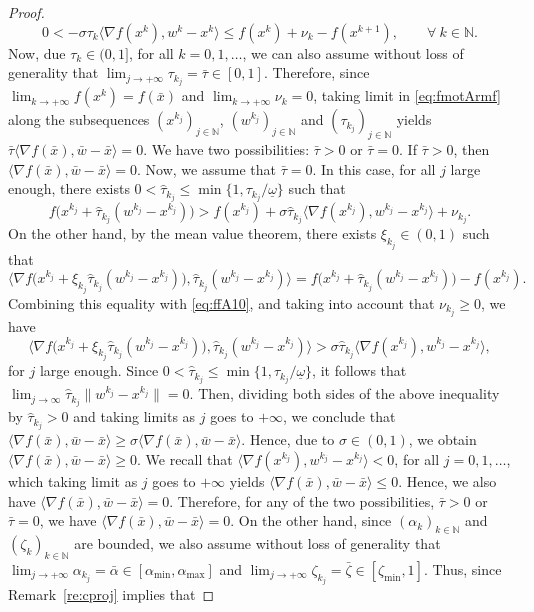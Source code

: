 \begin{proof}
	\begin{equation}\label{eq:fmotArmf}
		0 < -\sigma\tau_{k} \big\langle \nabla f(x^{k}), w^{k}-x^{k} \big\rangle \leq f(x^{k}) +\nu_k- f(x^{k+1}), \qquad \forall ~k \in \mathbb{N}.
	\end{equation}
	Now, due $\tau_k \in (0,1]$, for all $k=0,1, \ldots$, we can also assume without loss of generality that $\lim_{j \to +\infty} \tau_{k_j} = \bar{\tau} \in [0,1].$
	Therefore,   since $\lim_{k\to +\infty} f(x^{k}) =f(\bar{x})$ and $\lim_{k\to +\infty} \nu_{k} = 0$, taking limit in \eqref{eq:fmotArmf} along the  subsequences  $(x^{k_j})_{j\in\mathbb{N}}$,  $(w^{k_j})_{j\in\mathbb{N}}$ and $(\tau_{k_j})_{j\in\mathbb{N}}$  yields
	$
		\bar{\tau} \big\langle \nabla f(\bar{x}), \bar{w}- \bar{x} \big\rangle=0.
	$
	We have two possibilities: $\bar{\tau} > 0$ or $\bar{\tau} = 0$. If $\bar{\tau} > 0$, then  $\big\langle \nabla f(\bar{x}), \bar{w}- \bar{x} \big\rangle = 0.$  
		Now, we  assume that $\bar{\tau} = 0$. In this case, for all $j$ large enough, there exists $0<\hat\tau_{k_j}\leq \min\{1,\tau_{k_j}/\underline\omega\}$ such that
	\begin{equation}\label{eq:ffA10}		
		f\big(x^{k_j}+\hat\tau_{k_j} (w^{k_j} - x^{k_j})\big) > f(x^{k_j}) + \sigma \hat\tau_{k_j} \big\langle \nabla f(x^{k_j}), w^{k_j} - x^{k_j} \big\rangle +\nu_{k_j}.
	\end{equation}
On the other hand, by the mean value theorem, there exists $\xi_{k_j}\in(0,1)$ such that
		$$\langle \nabla f\big(x^{k_j}+\xi_{k_j}\hat\tau_{k_j} (w^{k_j} - x^{k_j})\big), \hat\tau_{k_j} (w^{k_j} - x^{k_j})\rangle = f\big(x^{k_j}+\hat\tau_{k_j} (w^{k_j} - x^{k_j})\big) - f(x^{k_j}).$$
Combining this equality with \eqref{eq:ffA10}, and taking into account that $\nu_{k_j}\geq 0$, we have 
		$$\langle \nabla f\big(x^{k_j}+\xi_{k_j}\hat\tau_{k_j} (w^{k_j} - x^{k_j})\big), \hat\tau_{k_j} (w^{k_j} - x^{k_j})\rangle>\sigma \hat\tau_{k_j} \big\langle \nabla f(x^{k_j}), w^{k_j} - x^{k_j} \big\rangle,$$
 for $j$ large enough. Since $0<\hat\tau_{k_j}\leq \min\{1,\tau_{k_j}/\underline\omega\}$, it follows that $\lim_{j\to\infty} \hat\tau_{k_j} \|w^{k_j} - x^{k_j}\|=0$. Then, dividing both sides of the above inequality by $\hat\tau_{k_j}>0$ and taking limits as $j$ goes to $+\infty$, we conclude that $ \langle \nabla f(\bar{x}), \bar{w}-\bar{x} \rangle \geq \sigma \langle \nabla f(\bar{x}), \bar{w}-\bar{x} \rangle$.   Hence, due to $\sigma \in (0, 1)$, we obtain $\langle \nabla f(\bar{x}), \bar{w}-\bar{x} \rangle \geq 0$. We recall that $\langle \nabla f(x^{k_j}), w^{k_j}- x^{k_j} \rangle < 0$, for all $j=0, 1, \ldots$, which taking limit as $j$ goes to $+\infty$ yields $\langle \nabla f(\bar{x}), \bar{w}-\bar{x} \rangle \leq 0$. Hence, we also have $\langle \nabla f(\bar{x}), \bar{w}-\bar{x} \rangle = 0$. Therefore, for any of the two possibilities, $\bar{\tau} > 0$ or $\bar{\tau} = 0$, we have $\langle \nabla f(\bar{x}), \bar{w}-\bar{x} \rangle = 0$. On the other hand,  since  $(\alpha_k)_{k\in\mathbb{N}}$ and    $(\zeta_k)_{k\in\mathbb{N}}$   are  bounded, we also assume without loss of generality that $\lim_{j \to +\infty} \alpha_{k_j} = \bar{\alpha} \in [\alpha_{\min}, \alpha_{\max}]$ and $\lim_{j \to +\infty} \zeta_{k_j} = {\bar \zeta} \in [\zeta_{\min}, 1]$. Thus, since Remark~\ref{re:cproj} implies that

\end{proof}
